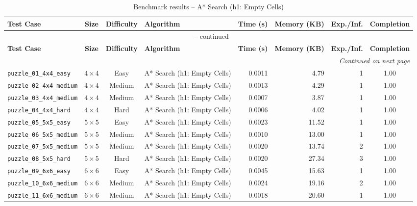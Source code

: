 \documentclass{article}
\begin{document}
\begin{longtable}{@{}lccl r r r c@{}}
  \caption{Benchmark results -- A* Search (h1: Empty Cells)} \label{tab:a__search__h1__empty_cells} \\
  \toprule
  \textbf{Test Case} & \textbf{Size} & \textbf{Difficulty} & \textbf{Algorithm} & \textbf{Time (s)} & \textbf{Memory (KB)} & \textbf{Exp./Inf.} & \textbf{Completion} \\
  \midrule
  \endfirsthead
  \multicolumn{8}{c}{\tablename\ \thetable{} -- continued} \\
  \toprule
  \textbf{Test Case} & \textbf{Size} & \textbf{Difficulty} & \textbf{Algorithm} & \textbf{Time (s)} & \textbf{Memory (KB)} & \textbf{Exp./Inf.} & \textbf{Completion} \\
  \midrule
  \endhead
  \midrule
  \multicolumn{8}{r}{\textit{Continued on next page}} \\
  \endfoot
  \bottomrule
  \endlastfoot
  \texttt{puzzle\_01\_4x4\_easy} & $4\times4$ & Easy & A* Search (h1: Empty Cells) & 0.0011 & 4.79 & 1 & 1.00 \\
  \texttt{puzzle\_02\_4x4\_medium} & $4\times4$ & Medium & A* Search (h1: Empty Cells) & 0.0013 & 4.29 & 1 & 1.00 \\
  \texttt{puzzle\_03\_4x4\_medium} & $4\times4$ & Medium & A* Search (h1: Empty Cells) & 0.0007 & 3.87 & 1 & 1.00 \\
  \texttt{puzzle\_04\_4x4\_hard} & $4\times4$ & Hard & A* Search (h1: Empty Cells) & 0.0006 & 4.02 & 1 & 1.00 \\
  \texttt{puzzle\_05\_5x5\_easy} & $5\times5$ & Easy & A* Search (h1: Empty Cells) & 0.0023 & 11.52 & 1 & 1.00 \\
  \texttt{puzzle\_06\_5x5\_medium} & $5\times5$ & Medium & A* Search (h1: Empty Cells) & 0.0010 & 13.00 & 1 & 1.00 \\
  \texttt{puzzle\_07\_5x5\_medium} & $5\times5$ & Medium & A* Search (h1: Empty Cells) & 0.0020 & 13.74 & 2 & 1.00 \\
  \texttt{puzzle\_08\_5x5\_hard} & $5\times5$ & Hard & A* Search (h1: Empty Cells) & 0.0020 & 27.34 & 3 & 1.00 \\
  \texttt{puzzle\_09\_6x6\_easy} & $6\times6$ & Easy & A* Search (h1: Empty Cells) & 0.0045 & 15.63 & 1 & 1.00 \\
  \texttt{puzzle\_10\_6x6\_medium} & $6\times6$ & Medium & A* Search (h1: Empty Cells) & 0.0024 & 19.16 & 2 & 1.00 \\
  \texttt{puzzle\_11\_6x6\_medium} & $6\times6$ & Medium & A* Search (h1: Empty Cells) & 0.0018 & 20.60 & 1 & 1.00 \\

\end{longtable}
\end{document}
